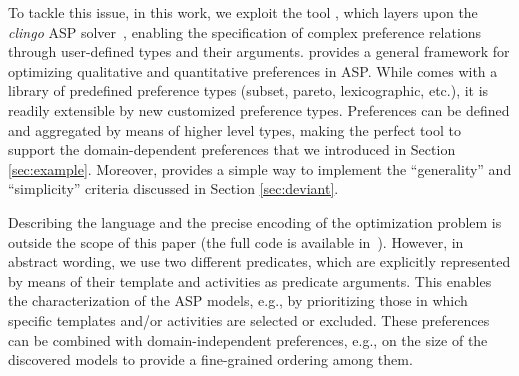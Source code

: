 To tackle this issue, in this work, we exploit the \asprin tool \cite{DBLP:conf/aaai/BrewkaD0S15}, which layers upon the \emph{clingo} \ac{ASP} solver~\cite{clingo}, enabling the specification of complex preference relations through user-defined  types and their arguments. 
%
%
\asprin provides a general framework for optimizing qualitative and quantitative preferences in \ac{ASP}. %
While \asprin comes with a library of predefined preference types (subset, pareto, lexicographic, etc.), it is readily extensible by new customized preference types. Preferences can be defined and aggregated by means of higher level types, making \asprin the perfect tool to support the domain-dependent preferences that we introduced in Section \ref{sec:example}. Moreover, %
\asprin provides a simple way to implement the ``generality'' and ``simplicity'' criteria discussed in Section \ref{sec:deviant}.



Describing the \asprin language and the precise encoding of the optimization problem is outside the scope of this paper (the full code is available in~\cite{zenodo:experiments}). However, in abstract wording, we use two different predicates,
which are explicitly represented by means of their template and activities as predicate arguments.
%
This enables the characterization of the \ac{ASP} models, e.g., by prioritizing those in which specific templates and/or activities are selected or excluded. These preferences can be combined with domain-independent preferences, e.g., on the size of the discovered models to provide a fine-grained ordering among them.
